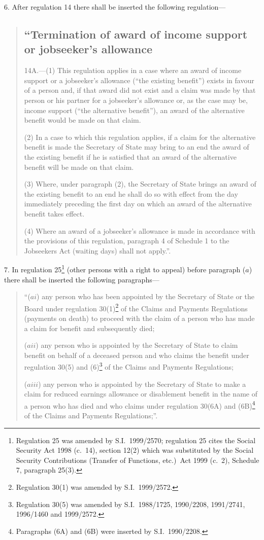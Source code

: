 \documentclass[12pt,a4paper]{article}
\begin{document}
6.  After regulation 14 there shall be inserted the following regulation—
\begin{quotation}
\subsection*{\sloppy “Termination of award of income support or jobseeker’s allowance}

14A.---(1)  This regulation applies in a case where an award of income support or a jobseeker’s allowance (“the existing benefit”) exists in favour of a person and, if that award did not exist and a claim was made by that person or his partner for a jobseeker’s allowance or, as the case may be, income support (“the alternative benefit”), an award of the alternative benefit would be made on that claim.

(2) In a case to which this regulation applies, if a claim for the alternative benefit is made the Secretary of State may bring to an end the award of the existing benefit if he is satisfied that an award of the alternative benefit will be made on that claim.

(3) Where, under paragraph (2), the Secretary of State brings an award of the existing benefit to an end he shall do so with effect from the day immediately preceding the first day on which an award of the alternative benefit takes effect.

(4) Where an award of a jobseeker’s allowance is made in accordance with the provisions of this regulation, paragraph 4 of Schedule 1 to the Jobseekers Act (waiting days) shall not apply.”.
\end{quotation}

\medskip

7.  In regulation 25\footnote{Regulation 25 was amended by S.I.\ 1999/2570; regulation 25 cites the Social Security Act 1998 (c.\ 14), section 12(2) which was substituted by the Social Security Contributions (Transfer of Functions, etc.)\ Act 1999 (c.\ 2), Schedule 7, paragraph 25(3).} (other persons with a right to appeal) before paragraph ($a$)  there shall be inserted the following paragraphs—
\begin{quotation}
“($ai$) any person who has been appointed by the Secretary of State or the Board under regulation 30(1)\footnote{Regulation 30(1) was amended by S.I.\ 1999/2572.} of the Claims and Payments Regulations (payments on death) to proceed with the claim of a person who has made a claim for benefit and subsequently died;

($aii$) any person who is appointed by the Secretary of State to claim benefit on behalf of a deceased person and who claims the benefit under regulation 30(5) and (6)\footnote{Regulation 30(5) was amended by S.I.\ 1988/1725, 1990/2208, 1991/2741, 1996/1460 and 1999/2572.} of the Claims and Payments Regulations;

($aiii$) any person who is appointed by the Secretary of State to make a claim for reduced earnings allowance or disablement benefit in the name of a person who has died and who claims under regulation 30(6A) and (6B)\footnote{Paragraphs (6A) and (6B) were inserted by S.I.\ 1990/2208.} of the Claims and Payments Regulations;”.
\end{quotation}
\end{document}
